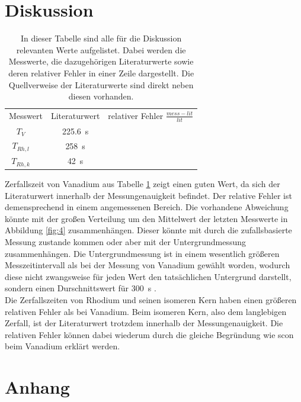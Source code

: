 \section{Diskussion}
\begin{table}
\centering
\caption{In dieser Tabelle sind alle für die Diskussion relevanten Werte aufgelistet. 
Dabei werden die Messwerte, die dazugehörigen Literaturwerte sowie deren relativer Fehler
in einer Zeile dargestellt. Die Quellverweise der Literaturwerte sind direkt neben diesen vorhanden.
}
\label{tab:3}
\begin{tabular}[H]{c c c c}
    \toprule
    \multicolumn{2}{c}{Messwert} & \multicolumn{1}{c}{Literaturwert } & \multicolumn{1}{c}{relativer Fehler $\frac{mess-lit}{lit} $ }\\
    \cmidrule(lr){1-4}
      $T_{V} $   &   & \SI{225.6}{\second}\cite{szabo1986determination}  &  \\
      $T_{Rh,l} $   &   & \SI{258}{\second} \cite{flammersfeld1946isomere}  &  \\
      $T_{Rh,k} $   &   & \SI{42}{\second} \cite{flammersfeld1946isomere}  &  \\
    \bottomrule
\end{tabular}
\end{table}

\justifying Zerfallszeit von Vanadium aus Tabelle \ref{tab:3}  zeigt einen guten Wert, da sich der Literaturwert innerhalb der
Messungenauigkeit befindet. Der relative Fehler ist demensprechend in einem angemessenen Bereich.
Die vorhandene Abweichung könnte mit der großen Verteilung um den Mittelwert der letzten Messwerte in Abbildung \ref{fig:4}
zusammenhängen. Dieser könnte mit durch die zufallsbasierte Messung zustande kommen oder aber mit 
der Untergrundmessung zusammenhängen. Die Untergrundmessung ist in einem wesentlich größeren Messzeitintervall
als bei der Messung von Vanadium gewählt worden, wodurch diese nicht zwangsweise für jeden Wert den tatsächlichen Untergrund darstellt,
sondern einen Durschnittswert für \SI{300}{\second} .\\
Die Zerfallszeiten von Rhodium und seinen isomeren Kern haben  einen größeren 
relativen Fehler als bei Vanadium. Beim isomeren Kern, also dem langlebigen Zerfall, ist der Literaturwert 
trotzdem innerhalb der Messungenauigkeit. Die relativen Fehler können dabei wiederum durch die gleiche Begründung wie
scon beim Vanadium erklärt werden. 


\newpage
\printbibliography
\newpage
\section*{Anhang}

\newpage


